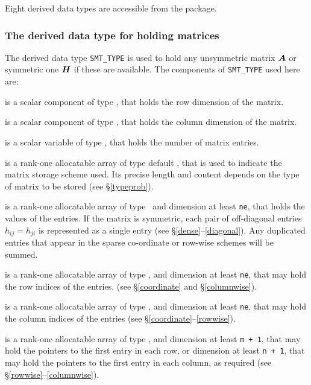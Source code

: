 \documentclass{galahad}
\begin{document}




\galtypes
Eight derived data types are accessible from the package.


\subsubsection{The derived data type for holding matrices}\label{typesmt}
The derived data type {\tt SMT\_TYPE} is used to hold any 
unsymmetric matrix ${\bm{A}}$ or symmetric one ${\bm{H}}$ if these are available. 
The components of {\tt SMT\_TYPE} used here are:

\begin{description}

 is a scalar component of type \integer,
that holds the row dimension of the matrix.

 is a scalar component of type \integer,
that holds the column dimension of the matrix.

 is a scalar variable of type \integer, that
holds the number of matrix entries.

 is a rank-one allocatable array of type default \character, that
is used to indicate the matrix storage scheme used. Its precise length and
content depends on the type of matrix to be stored (see \S\ref{typeprob}).

 is a rank-one allocatable array of type \realdp\,
and dimension at least {\tt ne}, that holds the values of the entries.
If the matrix is symmetric, each pair of off-diagonal entries $h_{ij} = h_{ji}$ 
is represented as a single entry (see \S\ref{dense}--\ref{diagonal}).
Any duplicated entries that appear in the sparse
co-ordinate or row-wise schemes will be summed.

 is a rank-one allocatable array of type \integer,
and dimension at least {\tt ne}, that may hold the row indices of the entries.
(see \S\ref{coordinate} and \S\ref{columnwise}).

 is a rank-one allocatable array of type \integer,
and dimension at least {\tt ne}, that may hold the column indices of the entries
(see \S\ref{coordinate}--\ref{rowwise}).

 is a rank-one allocatable array of type \integer,
and dimension at least {\tt m + 1}, that may hold the pointers to
the first entry in each row, or dimension at least {\tt n + 1}, that may hold 
the pointers to the first entry in each column, as required
(see \S\ref{rowwise}--\ref{columnwise}).

\end{description}
\end{document}
